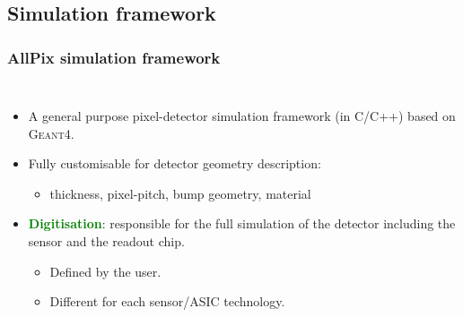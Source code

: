 \subsection{Simulation framework}
\begin{frame}
  \frametitle{}
  \tableofcontents[currentsubsection]
\end{frame}
\begin{frame}
  \frametitle{AllPix simulation framework}

  \begin{columns}

    \begin{itemize}
    \item A general purpose pixel-detector simulation framework (in
      C/C++) based on \textsc{Geant4}.
    \item Fully customisable for detector geometry description:
      \begin{itemize}
      \item thickness, pixel-pitch, bump geometry, material
      \end{itemize}
    \item \textcolor{Green}{\textbf{Digitisation}}: responsible for the
      full simulation of the detector including the sensor and the
      readout chip. 
      \begin{itemize}
      \item Defined by the user.
      \item Different for each sensor/ASIC technology.
      \end{itemize}
    \end{itemize}
    
    \centering


\end{columns}
\end{frame}
